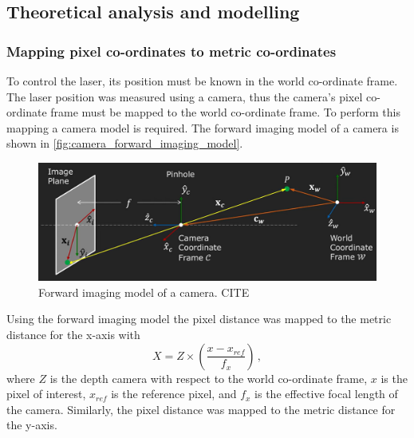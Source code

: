 \subsection{Theoretical analysis and modelling}

\subsubsection{Mapping pixel co-ordinates to metric co-ordinates}

To control the laser, its position must be known in the world co-ordinate frame. The laser position was measured using a camera, thus the camera's pixel co-ordinate frame must be mapped to the world co-ordinate frame. To perform this mapping a camera model is required. The forward imaging model of a camera is shown in \autoref{fig:camera_forward_imaging_model}.
\begin{figure}
    \centering
    \includegraphics[width=1\textwidth]{figures/camera/forward_imaging_model.png}
    \caption{Forward imaging model of a camera. CITE}
    \label{fig:camera_forward_imaging_model}
\end{figure}

Using the forward imaging model the pixel distance was mapped to the metric distance for the x-axis with
\begin{equation}
    X = Z \times \left( \frac{x - x_{ref}}{f_x} \right)\,,
    \label{eq:pixel_to_metric}
\end{equation}
where $Z$ is the depth camera with respect to the world co-ordinate frame, $x$ is the pixel of interest, $x_{ref}$ is the reference pixel, and $f_x$ is the effective focal length of the camera. Similarly, the pixel distance was mapped to the metric distance for the y-axis.

